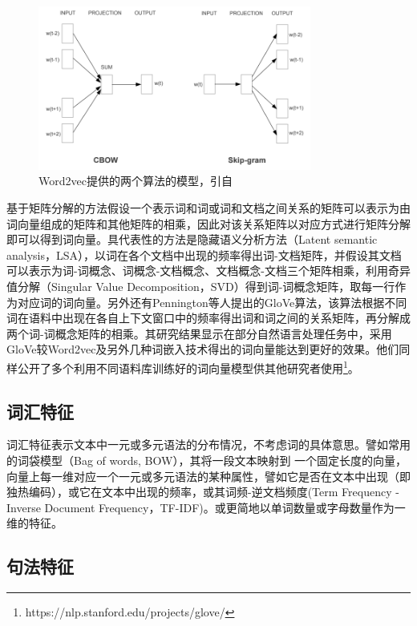\begin{figure}[H]
  \centering
  \includegraphics[width=0.8\textwidth]{img/word2vec.png}
  \caption{Word2vec提供的两个算法的模型，引自\cite{mikolov2013efficient}}
  \label{fig:word2vec}
\end{figure}

基于矩阵分解的方法假设一个表示词和词或词和文档之间关系的矩阵可以表示为由词向量组成的矩阵和其他矩阵的相乘，因此对该关系矩阵以对应方式进行矩阵分解即可以得到词向量。具代表性的方法是隐藏语义分析方法（Latent semantic analysis，LSA）\cite{deerwester1990indexing}，以词在各个文档中出现的频率得出词-文档矩阵，并假设其文档可以表示为词-词概念、词概念-文档概念、文档概念-文档三个矩阵相乘，利用奇异值分解（Singular Value Decomposition，SVD）得到词-词概念矩阵，取每一行作为对应词的词向量。另外还有Pennington等人\cite{pennington2014glove}提出的GloVe算法，该算法根据不同词在语料中出现在各自上下文窗口中的频率得出词和词之间的关系矩阵，再分解成两个词-词概念矩阵的相乘。其研究结果显示在部分自然语言处理任务中，采用GloVe较Word2vec及另外几种词嵌入技术得出的词向量能达到更好的效果。他们同样公开了多个利用不同语料库训练好的词向量模型供其他研究者使用\footnote{https://nlp.stanford.edu/projects/glove/}。

\subsection{词汇特征} %

词汇特征表示文本中一元或多元语法的分布情况，不考虑词的具体意思。譬如常用的词袋模型（Bag of words, BOW），其将一段文本映射到 一个固定长度的向量，向量上每一维对应一个一元或多元语法的某种属性，譬如它是否在文本中出现（即独热编码），或它在文本中出现的频率，或其词频-逆文档频度(Term Frequency - Inverse Document Frequency，TF-IDF)。或更简地以单词数量或字母数量作为一维的特征。

\subsection{句法特征} %

